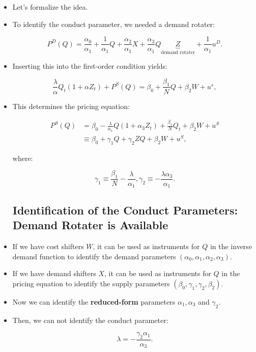 \documentclass[]{book}
\providecommand{\tightlist}{%
  \setlength{\itemsep}{0pt}\setlength{\parskip}{0pt}}
\begin{document}
\begin{itemize}
\tightlist
\item
  Let's formalize the idea.
\item
  To identify the conduct parameter, we needed a demand rotater:

  \begin{equation}
  P^D(Q) = \frac{\alpha_0}{\alpha_1} + \frac{1}{\alpha_1}Q + \frac{\alpha_2}{\alpha_1} X + \frac{\alpha_3}{\alpha_1} Q \underbrace{Z}_{\text{demand rotater}} +  \frac{1}{\alpha_1}u^D.
  \end{equation}
\item
  Inserting this into the first-order condition yields:

  \begin{equation}
  \frac{\lambda}{\alpha} Q_t (1 + \alpha Z_t)+ P^S(Q) = \beta_0 + \frac{\beta_1}{N} Q + \beta_2 W + u^s,
  \end{equation}
\item
  This determines the pricing equation:

  \begin{equation}
  \begin{split}
  P^S(Q) &= \beta_0 - \frac{\lambda}{\alpha_1} Q(1 + \alpha_3 Z_t) + \frac{\beta_1}{N} Q_t + \beta_2 W + u^S\\
  &\equiv \beta_0 + \gamma_1 Q + \gamma_2 Z Q + \beta_2 W + u^S,
  \end{split}
  \end{equation}

  where:

  \begin{equation}
  \gamma_1 \equiv \frac{\beta_1}{N} - \frac{\lambda}{\alpha_1}, \gamma_2 \equiv - \frac{\lambda \alpha_3}{\alpha_1}.
  \end{equation}

  \subsection{Identification of the Conduct Parameters: Demand Rotater
  is
  Available}\label{identification-of-the-conduct-parameters-demand-rotater-is-available}
\item
  If we have cost shifters \(W\), it can be used as instruments for
  \(Q\) in the inverse demand function to identify the demand parameters
  \((\alpha_0, \alpha_1, \alpha_2, \alpha_3)\).
\item
  If we have demand shifters \(X\), it can be used as instruments for
  \(Q\) in the pricing equation to identify the supply parameters
  \((\beta_0, \gamma_1, \gamma_2, \beta_2)\).
\item
  Now we can identify the \textbf{reduced-form} parameters
  \(\alpha_1, \alpha_3\) and \(\gamma_2\).
\item
  Then, we can not identify the conduct parameter:

  \begin{equation}
  \lambda = - \frac{\gamma_2 \alpha_1}{\alpha_3}.
  \end{equation}
\end{itemize}
\end{document}
